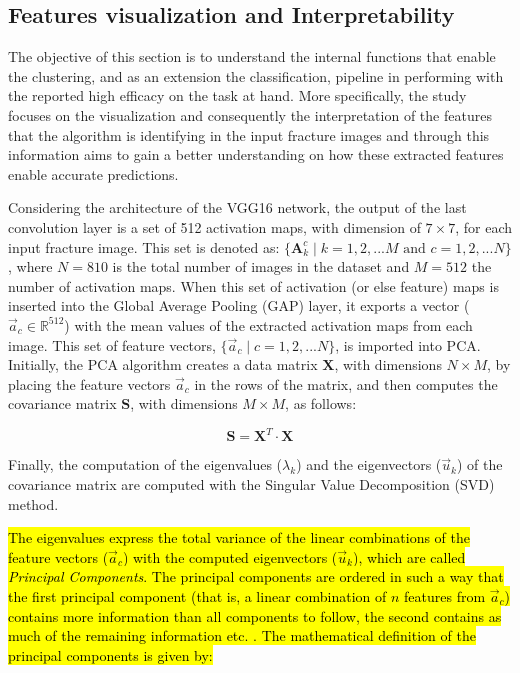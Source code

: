 \documentclass[authoryear,preprint,review,12pt, singleside]{elsarticle}
\begin{document}
\subsection{Features visualization and Interpretability}

The objective of this section is to understand the internal functions that enable the clustering, and as an extension the classification, pipeline in performing with the reported high efficacy on the task at hand. More specifically, the study focuses on the visualization and consequently the interpretation of the features that the algorithm is identifying in the input fracture images and through this information aims to gain a better understanding on how these extracted features enable accurate predictions. 

Considering the architecture of the VGG16 network, the output of the last convolution layer is a set of 512 activation maps, with dimension of $7 \times 7$, for each input fracture image. This set is  denoted as: $\{\textbf{A}_k^c \; | \; k=1,2, ... M \text{ and } c=1,2, ... N\}$, where $N=810$ is the total number of images in the dataset and $M=512$ the number of activation maps. When this set of activation (or else feature) maps is inserted into the Global Average Pooling (GAP) layer, it exports a vector ($\vec{a}_c \in \mathbb{R}^{512}$) with the mean values of the extracted activation maps from each image. This set of feature vectors, $\{\vec{a}_c \; | \; c=1,2, ... N\}$, is imported into PCA. Initially, the PCA algorithm creates a data matrix $\textbf{X}$, with dimensions $N \times M$, by placing the feature vectors $\vec{a}_c$ in the rows of the matrix, and then computes the covariance matrix $\textbf{S}$, with dimensions $M \times M$, as follows: 

\begin{equation*}
\textbf{S} = \textbf{X}^T \cdot \textbf{X}
\end{equation*}

Finally, the computation of the eigenvalues ($\lambda_k$) and the eigenvectors ($\vec{u}_k$) of the covariance matrix are computed with the Singular Value Decomposition (SVD) method. 

\hl{The eigenvalues express the total variance of the linear combinations of the feature vectors ($\vec{a}_c$) with the computed eigenvectors ($\vec{u}_k$), which are called \textit{Principal Components}. The principal components are ordered in such a way that the first principal component (that is, a linear combination of $n$ features from  $\vec{a}_c$) contains more information than all components to follow, the second contains as much of the remaining information etc. . The mathematical definition of the principal components is given by:}
\end{document}
